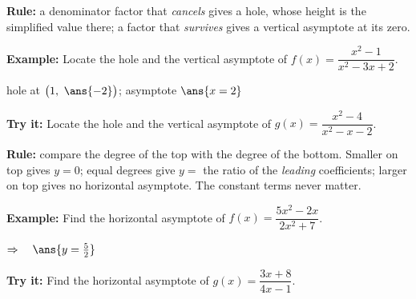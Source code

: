 \documentclass[12pt]{article}
\begin{document}

\begin{formulabox}
\textbf{Rule:} a denominator factor that \emph{cancels} gives a hole, whose
height is the simplified value there; a factor that \emph{survives} gives a
vertical asymptote at its zero.
\end{formulabox}

\begin{examplebox}
\textbf{Example:} \quad Locate the hole and the vertical asymptote of
$f(x) = \dfrac{x^2-1}{x^2-3x+2}$.

hole at $\bigl(1,\ \ans{-2}\bigr)$; \quad asymptote $\ans{x = 2}$
\end{examplebox}

\begin{tryitbox}
\textbf{Try it:} \quad Locate the hole and the vertical asymptote of
$g(x) = \dfrac{x^2-4}{x^2-x-2}$.\\[2pt]
\end{tryitbox}


\begin{formulabox}
\textbf{Rule:} compare the degree of the top with the degree of the bottom.
Smaller on top gives $y = 0$; equal degrees give $y = $ the ratio of the
\emph{leading} coefficients; larger on top gives no horizontal asymptote. The
constant terms never matter.
\end{formulabox}

\begin{examplebox}
\textbf{Example:} \quad Find the horizontal asymptote of
$f(x) = \dfrac{5x^2-2x}{2x^2+7}$.

$\Rightarrow\quad \ans{y = \tfrac{5}{2}}$
\end{examplebox}

\begin{tryitbox}
\textbf{Try it:} \quad Find the horizontal asymptote of
$g(x) = \dfrac{3x+8}{4x-1}$.\\[2pt]
\end{tryitbox}
\end{document}
